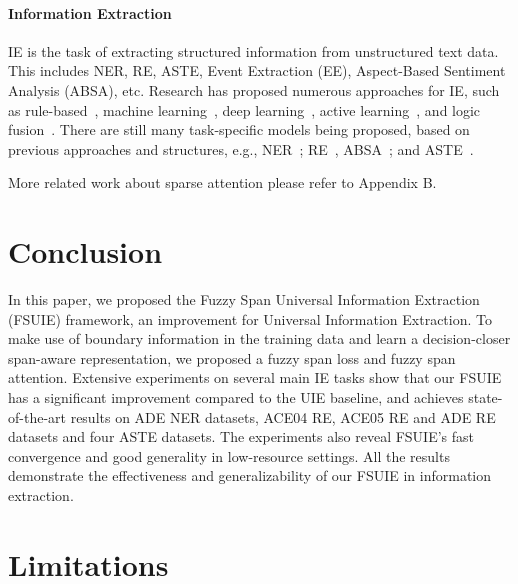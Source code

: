 \documentclass[11pt]{article}
\begin{document}
\paragraph{Information Extraction}


IE is the task of extracting structured information from unstructured text data. This includes NER, RE, ASTE, Event Extraction (EE), Aspect-Based Sentiment Analysis (ABSA), etc. Research has proposed numerous approaches for IE, such as rule-based~\cite{appelt-onyshkevych-1998-common}, machine learning~\cite{DBLP:conf/cicling/Tellez-ValeroMP05, kolya-etal-2010-supervised}, deep learning~\cite{qin-etal-2018-robust}, active learning~\cite{radmard-etal-2021-subsequence}, and logic fusion~\cite{DBLP:conf/aaai/WangP20}.
There are still many task-specific models being proposed, based on previous approaches and structures, e.g., NER~\cite{li-etal-2022-unsupervised-multiple, zhu-li-2022-boundary,DBLP:conf/coling/YangLZ22,DBLP:journals/corr/abs-1909-01065}; RE~\cite{nan-etal-2020-reasoning, lai-etal-2021-joint}, ABSA~\cite{jing-etal-2021-seeking}; and ASTE~\cite{xu-etal-2021-learning, xu-etal-2020-position}. 

More related work about sparse attention please refer to Appendix B.


\section{Conclusion}


In this paper, we proposed the Fuzzy Span Universal Information Extraction (FSUIE) framework, an improvement for Universal Information Extraction. To make use of boundary information in the training data and learn a decision-closer span-aware representation, we proposed a fuzzy span loss and fuzzy span attention. Extensive experiments on several main IE tasks show that our FSUIE has a significant improvement compared to the UIE baseline, and achieves state-of-the-art results on ADE NER datasets, ACE04 RE, ACE05 RE and ADE RE datasets and four ASTE datasets. The experiments also reveal FSUIE's fast convergence and good generality in low-resource settings. All the results demonstrate the effectiveness and generalizability of our FSUIE in information extraction.




\section{Limitations}
\end{document}
